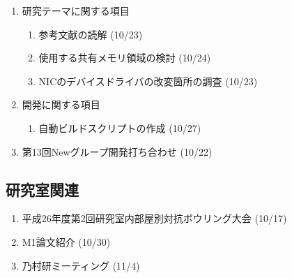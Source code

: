 \documentclass[fleqn, 14pt]{extarticle}
\begin{document}
\begin{enumerate}
\item 研究テーマに関する項目
\hfill
\begin{enumerate}


\item 参考文献の読解
\hfill
(10/23)

\item 使用する共有メモリ領域の検討
\hfill
(10/24)

\item NICのデバイスドライバの改変箇所の調査
\hfill
(10/23)

\end{enumerate}
\item 開発に関する項目
\hfill
\begin{enumerate}

\item 自動ビルドスクリプトの作成
\hfill
(10/27)

\end{enumerate}
\item 第13回Newグループ開発打ち合わせ
\hfill
\label{enum-7}
(10/22)
\end{enumerate}

\subsection{研究室関連}
\label{sec-4-2}

\begin{enumerate}

\item 平成26年度第2回研究室内部屋別対抗ボウリング大会
\hfill
\label{enum-10}
(10/17)
\item M1論文紹介
\hfill
\label{enum-11}
(10/30)
\item 乃村研ミーティング
\hfill
\label{enum-11}
(11/4)
\end{enumerate}
\end{document}
